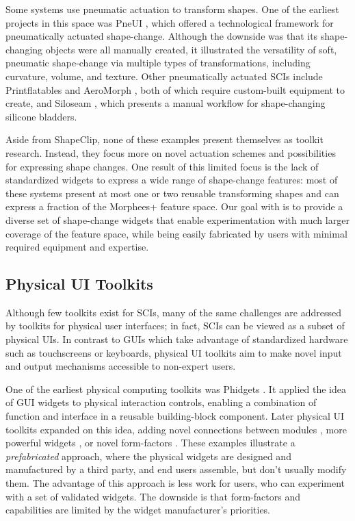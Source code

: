       Some systems use pneumatic actuation to transform shapes. One of the
      earliest projects in this space was PneUI \cite{Yao:2013}, which offered
      a technological framework for pneumatically actuated shape-change.
      Although the downside was that its shape-changing objects were all
      manually created, it illustrated the versatility of soft, pneumatic
      shape-change via multiple types of transformations, including curvature,
      volume, and texture. Other pneumatically actuated SCIs include
      Printflatables \cite{Sareen:2017} and AeroMorph
      \cite{Ou:2016}, both of which require custom-built equipment to create,
      and Siloseam \cite{Moradi:2020}, which presents a manual workflow for
      shape-changing silicone bladders.
      
      Aside from ShapeClip, none of these examples present themselves as toolkit
      research. Instead, they focus more on novel actuation schemes and
      possibilities for expressing shape changes. One result of this limited
      focus is the lack of standardized widgets to express a wide range of
      shape-change features: most of these systems present at most one or two
      reusable transforming shapes and can express a fraction of the Morphees+
      \cite{10.1145/3173574.3174193} feature space. Our goal with \mp is to
      provide a diverse set of shape-change widgets that enable experimentation
      with much larger coverage of the feature space, while being easily
      fabricated by users with minimal required equipment and expertise.
        
    \subsection{Physical UI Toolkits}
      Although few toolkits exist for SCIs, many of the same challenges are
      addressed by toolkits for physical user interfaces; in fact, SCIs can be
      viewed as a subset of physical UIs. In contrast to GUIs which take
      advantage of standardized hardware such as touchscreens or keyboards,
      physical UI toolkits aim to make novel input and output mechanisms
      accessible to non-expert users.
      
      One of the earliest physical computing toolkits was Phidgets
      \cite{Greenberg:2001}. It applied the idea of GUI widgets to physical
      interaction controls, enabling a combination of function and interface in
      a reusable building-block component. Later physical UI toolkits expanded
      on this idea, adding novel connections between modules
      \cite{Bdeir:2009kz}, more powerful widgets \cite{Villar:2012}, or novel
      form-factors \cite{Hodges:2014}. These examples illustrate a
      \textit{prefabricated} approach, where the physical widgets are designed
      and manufactured by a third party, and end users assemble, but don't
      usually modify them. The advantage of this approach is less work for
      users, who can experiment with a set of validated widgets. The downside is
      that form-factors and capabilities are limited by the widget
      manufacturer's priorities.
      
